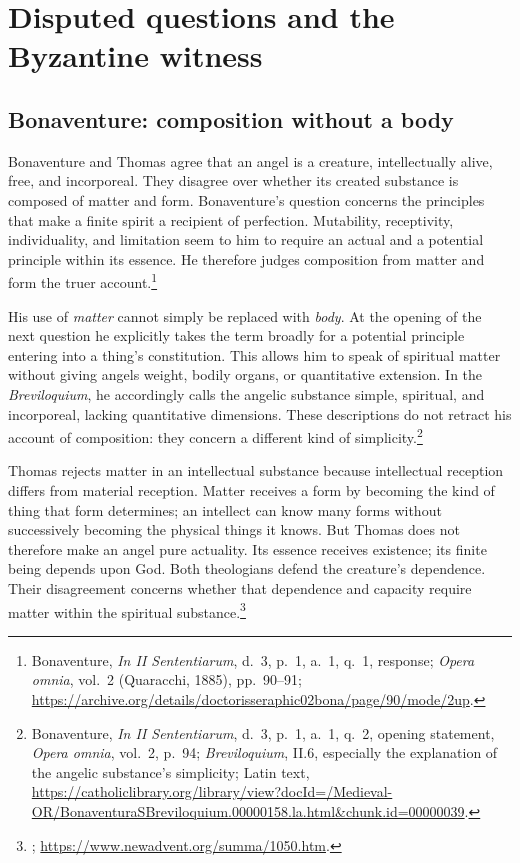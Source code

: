 \section{Disputed questions and the Byzantine witness}

\subsection{Bonaventure: composition without a body}

Bonaventure and Thomas agree that an angel is a creature, intellectually alive,
free, and incorporeal. They disagree over whether its created substance is
composed of matter and form. Bonaventure's question concerns the principles
that make a finite spirit a recipient of perfection. Mutability, receptivity,
individuality, and limitation seem to him to require an actual and a potential
principle within its essence. He therefore judges composition from matter and
form the truer account.\footnote{Bonaventure, \emph{In II Sententiarum},
d.~3, p.~1, a.~1, q.~1, response; \emph{Opera omnia}, vol.~2
(Quaracchi, 1885), pp.~90--91;
\url{https://archive.org/details/doctorisseraphic02bona/page/90/mode/2up}.}

His use of \emph{matter} cannot simply be replaced with \emph{body}. At the
opening of the next question he explicitly takes the term broadly for a
potential principle entering into a thing's constitution. This allows him
to speak of spiritual matter without giving angels weight, bodily organs,
or quantitative extension. In the \emph{Breviloquium}, he accordingly calls
the angelic substance simple, spiritual, and incorporeal, lacking quantitative
dimensions. These descriptions do not retract his account of composition:
they concern a different kind of simplicity.\footnote{Bonaventure,
\emph{In II Sententiarum}, d.~3, p.~1, a.~1, q.~2, opening statement,
\emph{Opera omnia}, vol.~2, p.~94;
\emph{Breviloquium}, II.6, especially the explanation of the angelic
substance's simplicity; Latin text,
\url{https://catholiclibrary.org/library/view?docId=/Medieval-OR/BonaventuraSBreviloquium.00000158.la.html\&chunk.id=00000039}.}

Thomas rejects matter in an intellectual substance because intellectual
reception differs from material reception. Matter receives a form by becoming
the kind of thing that form determines; an intellect can know many forms
without successively becoming the physical things it knows. But Thomas does
not therefore make an angel pure actuality. Its essence receives existence;
its finite being depends upon God. Both theologians defend the creature's
dependence. Their disagreement concerns whether that dependence and capacity
require matter within the spiritual substance.\footnote{;
\url{https://www.newadvent.org/summa/1050.htm}.}

